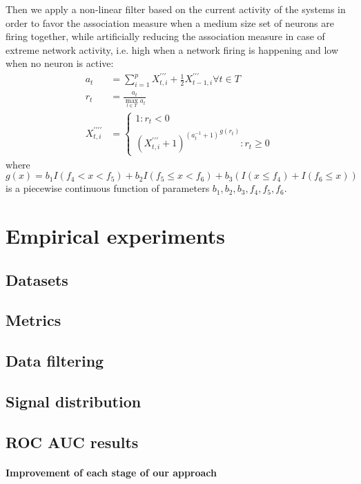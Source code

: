 \documentclass[wcp]{jmlr}
\begin{document}
Then we apply a non-linear filter based on the current
activity of the systems in order to favor the association measure when
a medium size set of neurons are firing together, while artificially
reducing the association measure in case of extreme network activity,
i.e. high when a network firing is happening and low when no neuron is
active:
\begin{align}
a_t &= \sum_{i=1}^p X^{\prime\prime\prime}_{t,i} +
                   \frac{1}{2} X^{\prime\prime\prime}_{t-1,i} \forall t \in T\\
r_t &= \frac{a_t}{\max_{l \in T}{a_l}} \\
X^{\prime\prime\prime\prime}_{t,i} &=
\left\{
  \begin{array}{l}
    1  : r_t < 0\\
    {(X^{\prime\prime\prime}_{t,i} + 1)^{(a_t^{-1} + 1)}}^{g(r_t)} : r_t \geq 0
  \end{array}
\right.
\end{align}
where $g(x) = b_1 I(f_4 < x < f_5) + b_2  I(f_5 \leq x < f_6) +
b_3 (I(x\leq f_4) + I(f_ 6 \leq x))$ is a piecewise continuous function of
parameters $b_1, b_2, b_3, f_4, f_5, f_6$.





\section{Empirical experiments}
\subsection{Datasets}




\subsection{Metrics}
\subsection{Data filtering}
\subsection{Signal distribution}
\subsection{ROC AUC results}
\paragraph{Improvement of each stage of our approach\\}
\end{document}
